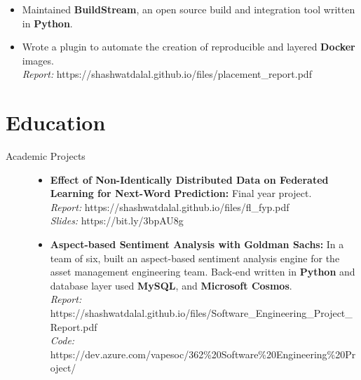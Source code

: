 \documentclass[a4paper]{deedy-resume} %
\begin{document}
\begin{description}
    \begin{itemize}
        \item Maintained \textbf{BuildStream}, an open source build and integration tool written in \textbf{Python}.
        \item Wrote a plugin to automate the creation of reproducible and layered \textbf{Docker} images.
        \\
        \textit{Report:} https://shashwatdalal.github.io/files/placement\_report.pdf \\
    \end{itemize}
\end{description}
\section{Education}
    \begin{description}
        \item[Academic Projects] \hspace{7.5cm}
            \begin{itemize}
                \item \textbf{Effect of Non-Identically Distributed Data on Federated Learning for Next-Word Prediction:} Final year project. \\
                \textit{Report: } https://shashwatdalal.github.io/files/fl\_fyp.pdf \\
                \textit{Slides: } https://bit.ly/3bpAU8g
                \item \textbf{Aspect-based Sentiment Analysis with Goldman Sachs:} In a team of six, built an aspect-based sentiment analysis engine for the asset management engineering team. Back-end written in \textbf{Python} and database layer used \textbf{MySQL}, and \textbf{Microsoft Cosmos}. \\
                \textit{Report:} https://shashwatdalal.github.io/files/Software\_Engineering\_Project\_Report.pdf \\ \textit{Code:} https://dev.azure.com/vapesoc/362\%20Software\%20Engineering\%20Project/
        \end{itemize}
    \end{description}
\end{document}
